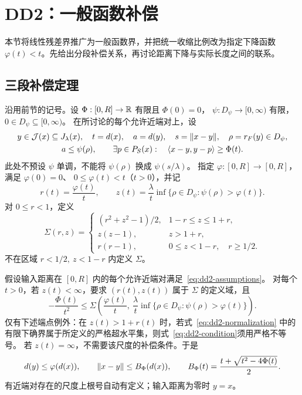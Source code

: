 \section{DD2：一般函数补偿}\label{sec:dd2}

本节将线性残差界推广为一般函数界，并把统一收缩比例改为指定下降函数
$\varphi(t)<t$。先给出分段补偿关系，再讨论距离下降与实际长度之间的联系。

\subsection{三段补偿定理}

沿用前节的记号。设 $\Phi:[0,R]\to\mathbb R$ 有限且 $\Phi(0)=0$，
$\psi:D_\psi\to[0,\infty)$ 有限，$0\in D_\psi\subseteq[0,\infty)$。
在所讨论的每个允许近端对上，设
\begin{equation}\label{eq:dd2-assumptions}
 \begin{gathered}
 y\in\mathcal J(x)\subseteq J_\lambda(x),\quad
 t=d(x),\quad a=d(y),\quad s=\lVert x-y\rVert,\quad \rho=r_F(y)\in D_\psi,\\
 a\le\psi(\rho),\qquad
 \exists p\in P_S(x):\quad \langle x-y,y-p\rangle\ge\Phi(t).
 \end{gathered}
\end{equation}
此处不预设 $\psi$ 单调，不能将 $\psi(\rho)$ 换成 $\psi(s/\lambda)$。
指定 $\varphi:[0,R]\to[0,R]$，满足 $\varphi(0)=0$、
$0\le\varphi(t)<t$（$t>0$），并记
\begin{equation}\label{eq:dd2-normalization}
 r(t)=\frac{\varphi(t)}t,\qquad
 z(t)=\frac{\lambda}{t}\inf\{\rho\in D_\psi:\psi(\rho)>\varphi(t)\}.
\end{equation}
对 $0\le r<1$，定义
\begin{equation}\label{eq:dd2-sigma}
 \boxed{\Sigma(r,z)=
 \begin{cases}
 (r^2+z^2-1)/2,&1-r\le z\le1+r,\\
 z(z-1),&z>1+r,\\
 r(r-1),&0\le z<1-r,\quad r\ge1/2.
 \end{cases}}
\end{equation}
不在区域 $r<1/2,\ z<1-r$ 内定义 $\Sigma$。

\begin{theorem}[DD2]\label{thm:dd2}
假设输入距离在 $[0,R]$ 内的每个允许近端对满足~\eqref{eq:dd2-assumptions}。
对每个 $t>0$，若 $z(t)<\infty$，要求 $(r(t),z(t))$ 属于 $\Sigma$ 的定义域，且
\begin{equation}\label{eq:dd2-condition}
 \boxed{-\frac{\Phi(t)}{t^2}\le
 \Sigma\left(\frac{\varphi(t)}t,\
 \frac{\lambda}{t}\inf\{\rho\in D_\psi:\psi(\rho)>\varphi(t)\}\right).}
\end{equation}
仅有下述端点例外：在 $z(t)>1+r(t)$ 时，若式~\eqref{eq:dd2-normalization}
中的有限下确界属于所定义的严格超水平集，则式~\eqref{eq:dd2-condition}须用严格不等号。
若 $z(t)=\infty$，不需要该尺度的补偿条件。于是
\begin{equation}\label{eq:dd2-conclusions}
 d(y)\le\varphi(d(x)),\qquad
 \lVert x-y\rVert\le B_\Phi(d(x)),\qquad
 B_\Phi(t)=\frac{t+\sqrt{t^2-4\Phi(t)}}2.
\end{equation}
有近端对存在的尺度上根号自动有定义；输入距离为零时 $y=x$。
\end{theorem}

